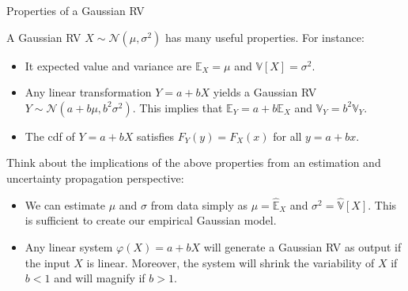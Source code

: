\documentclass[9pt]{beamer}
\begin{document}
%
\begin{frame}{Properties of a Gaussian RV}

A Gaussian RV $X\sim \mathcal{N}(\mu,\sigma^2)$ has many useful properties. For instance:
\begin{block}{}
\begin{itemize}
\item It expected value and variance are $\mathbb{E}_X=\mu$ and $\mathbb{V}[X]=\sigma^2$. 
\item Any linear transformation $Y=a+bX$ yields a Gaussian RV $Y\sim \mathcal{N}(a+b\mu,b^2\sigma^2)$. This implies that $\mathbb{E}_Y=a+b\mathbb{E}_X$ and $\mathbb{V}_Y=b^2\mathbb{V}_Y$. 
\item The cdf of $Y=a+bX$ satisfies $F_Y(y)=F_X(x)$ for all $y=a+bx$. 
\end{itemize}
\end{block}
Think about the implications of the above properties from an estimation and uncertainty propagation perspective: 
\begin{block}{}
\begin{itemize}
\item We can estimate  $\mu$ and $\sigma$ from data simply as $\mu =\hat{\mathbb{E}}_X$ and $\sigma^2=
\hat{\mathbb{V}}[X]$. This is sufficient to create our empirical Gaussian model. 
\item Any linear system $\varphi(X)=a+bX$ will generate a Gaussian RV as output if the input $X$ is linear. Moreover, the system will shrink the variability of $X$ if $b<1$ and will magnify if $b>1$. 
\end{itemize}
\end{block}

\end{frame}
\end{document}
